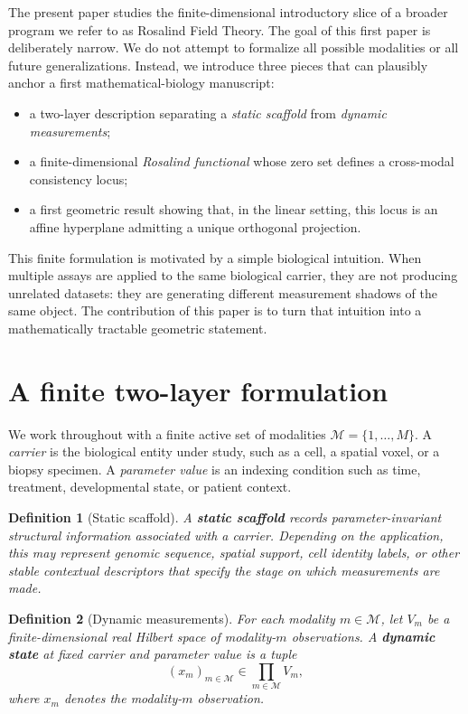 \documentclass[11pt]{article}
\newtheorem{definition}{Definition}[section]
\begin{document}
The present paper studies the finite-dimensional introductory slice of a broader program we refer to as Rosalind Field Theory. The goal of this first paper is deliberately narrow. We do not attempt to formalize all possible modalities or all future generalizations. Instead, we introduce three pieces that can plausibly anchor a first mathematical-biology manuscript:
\begin{itemize}[leftmargin=*]
    \item a two-layer description separating a \emph{static scaffold} from \emph{dynamic measurements};
    \item a finite-dimensional \emph{Rosalind functional} whose zero set defines a cross-modal consistency locus;
    \item a first geometric result showing that, in the linear setting, this locus is an affine hyperplane admitting a unique orthogonal projection.
\end{itemize}

This finite formulation is motivated by a simple biological intuition. When multiple assays are applied to the same biological carrier, they are not producing unrelated datasets: they are generating different measurement shadows of the same object. The contribution of this paper is to turn that intuition into a mathematically tractable geometric statement.

\section{A finite two-layer formulation}

We work throughout with a finite active set of modalities $\mathcal{M}=\{1,\dots,M\}$. A \emph{carrier} is the biological entity under study, such as a cell, a spatial voxel, or a biopsy specimen. A \emph{parameter value} is an indexing condition such as time, treatment, developmental state, or patient context.

\begin{definition}[Static scaffold]
A \textbf{static scaffold} records parameter-invariant structural information associated with a carrier. Depending on the application, this may represent genomic sequence, spatial support, cell identity labels, or other stable contextual descriptors that specify the stage on which measurements are made.
\end{definition}

\begin{definition}[Dynamic measurements]
For each modality $m\in\mathcal{M}$, let $V_m$ be a finite-dimensional real Hilbert space of modality-$m$ observations. A \textbf{dynamic state} at fixed carrier and parameter value is a tuple
\[
(x_m)_{m\in\mathcal{M}} \in \prod_{m\in\mathcal{M}} V_m,
\]
where $x_m$ denotes the modality-$m$ observation.
\end{definition}
\end{document}
